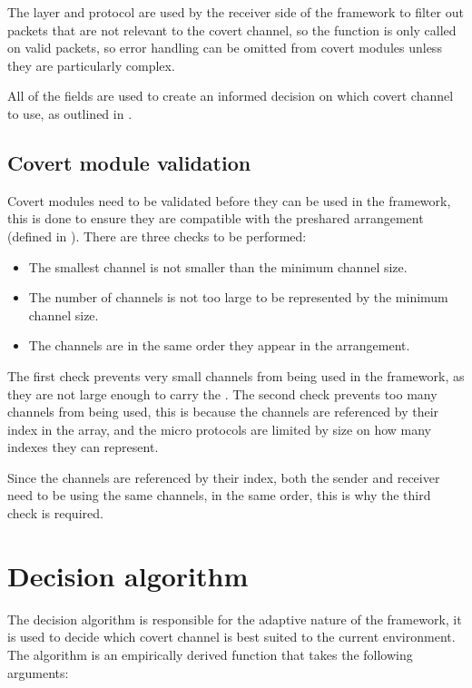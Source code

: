 The layer and protocol are used by the receiver side of the framework to filter out packets that are not relevant to the covert channel, so the  function is only called on valid packets, so error handling can be omitted from covert modules unless they are particularly complex.

All of the fields are used to create an informed decision on which covert channel to use, as outlined in .

\subsection{Covert module validation}

Covert modules need to be validated before they can be used in the framework, this is done to ensure they are compatible with the preshared arrangement (defined in ). There are three checks to be performed:

\begin{itemize}
    \item The smallest channel is not smaller than the minimum channel size.
    \item The number of channels is not too large to be represented by the minimum channel size.
    \item The channels are in the same order they appear in the arrangement.
\end{itemize}

The first check prevents very small channels from being used in the framework, as they are not large enough to carry the . The second check prevents too many channels from being used, this is because the channels are referenced by their index in the  array, and the micro protocols are limited by size on how many indexes they can represent.

Since the channels are referenced by their index, both the sender and receiver need to be using the same channels, in the same order, this is why the third check is required.

\section{Decision algorithm}
\label{sec:decision_algorithm}

The decision algorithm is responsible for the adaptive nature of the framework, it is used to decide which covert channel is best suited to the current environment.
The algorithm is an empirically derived function that takes the following arguments:

